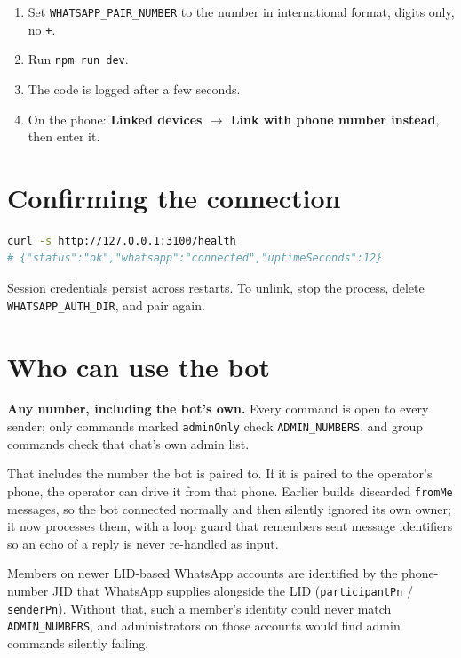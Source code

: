\documentclass[11pt,a4paper]{report}
\begin{document}
\begin{enumerate}
  \item Set \texttt{WHATSAPP\_PAIR\_NUMBER} to the number in international
        format, digits only, no \texttt{+}.
  \item Run \texttt{npm run dev}.
  \item The code is logged after a few seconds.
  \item On the phone: \textbf{Linked devices $\rightarrow$ Link with phone
        number instead}, then enter it.
\end{enumerate}

\section{Confirming the connection}

\begin{lstlisting}[language=bash]
curl -s http://127.0.0.1:3100/health
# {"status":"ok","whatsapp":"connected","uptimeSeconds":12}
\end{lstlisting}

Session credentials persist across restarts. To unlink, stop the process,
delete \texttt{WHATSAPP\allowbreak\_AUTH\allowbreak\_DIR}, and pair again.

\section{Who can use the bot}

\textbf{Any number, including the bot's own.} Every command is open to every
sender; only commands marked \texttt{adminOnly} check \texttt{ADMIN\_NUMBERS},
and group commands check that chat's own admin list.

That includes the number the bot is paired to. If it is paired to the
operator's phone, the operator can drive it from that phone. Earlier builds
discarded \texttt{fromMe} messages, so the bot connected normally and then
silently ignored its own owner; it now processes them, with a loop guard that
remembers sent message identifiers so an echo of a reply is never re-handled as
input.

Members on newer LID-based WhatsApp accounts are identified by the
phone-number JID that WhatsApp supplies alongside the LID
(\texttt{participantPn} / \texttt{senderPn}). Without that, such a member's
identity could never match \texttt{ADMIN\_NUMBERS}, and administrators on those
accounts would find admin commands silently failing.
\end{document}
